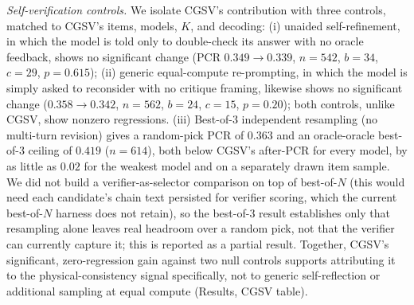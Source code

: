 \documentclass[pdflatex,sn-nature]{sn-jnl}
\begin{document}
\noindent\emph{Self-verification controls.} We isolate CGSV's contribution with three
controls, matched to CGSV's items, models, $K$, and decoding: (i) unaided
self-refinement, in which the model is told only to double-check its answer with no oracle
feedback, shows no significant change (PCR $0.349\to0.339$, $n=542$, $b=34$, $c=29$,
$p=0.615$); (ii) generic equal-compute re-prompting, in which the model is simply asked to
reconsider with no critique framing, likewise shows no significant change
($0.358\to0.342$, $n=562$, $b=24$, $c=15$, $p=0.20$); both controls, unlike CGSV, show
nonzero regressions. (iii) Best-of-3 independent resampling (no multi-turn revision) gives a
random-pick PCR of $0.363$ and an oracle-oracle best-of-3 ceiling of $0.419$ ($n=614$),
both below CGSV's after-PCR for every model, by as little as $0.02$ for the weakest model
and on a separately drawn item sample. We did not build a verifier-as-selector
comparison on top of best-of-$N$ (this would need each candidate's chain text persisted for
verifier scoring, which the current best-of-$N$ harness does not retain), so the
best-of-3 result establishes only that resampling alone leaves real headroom over a random
pick, not that the verifier can currently capture it; this is reported as a partial result. Together, CGSV's significant, zero-regression gain
against two null controls supports attributing it to the physical-consistency signal
specifically, not to generic self-reflection or additional sampling at equal compute
(Results, CGSV table).
\end{document}
